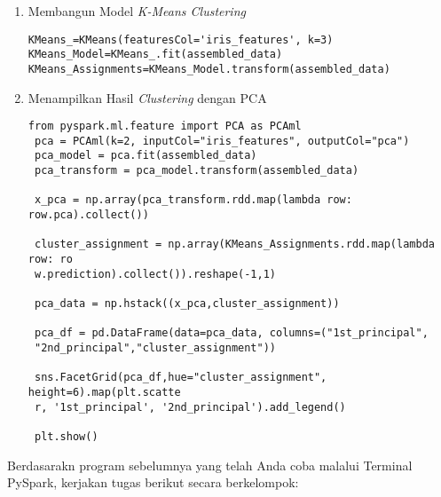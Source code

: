 \documentclass[a4paper]{tufte-handout}
\begin{document}
\begin{enumerate}
\begin{lstlisting}[language=Terminal]
for K in range(|\color{white}2|,11):
	KMeans_=KMeans(featuresCol='iris_features', k=K)
	KMeans_fit=KMeans_.fit(assembled_data)
	KMeans_transform=KMeans_fit.transform(assembled_data)
	evaluation_score=evaluator.evaluate(KMeans_transform)
	silhouette_scores.append(evaluation_score)

fig, ax = plt.subplots(1,1, figsize=(10,8))
ax.plot(range(2,11), silhouette_scores)
ax.set_xlabel('Jumlah Cluster')
ax.set_ylabel('Hasil Silhouette')
plt.show()
\end{lstlisting}

\item Membangun Model \textit{K-Means Clustering}
\begin{lstlisting}[language=Terminal]
KMeans_=KMeans(featuresCol='iris_features', k=3)
KMeans_Model=KMeans_.fit(assembled_data)
KMeans_Assignments=KMeans_Model.transform(assembled_data)
\end{lstlisting}

\item Menampilkan Hasil \textit{Clustering} dengan PCA
\begin{lstlisting}[language=Terminal]
 from pyspark.ml.feature import PCA as PCAml
 pca = PCAml(k=2, inputCol="iris_features", outputCol="pca")
 pca_model = pca.fit(assembled_data)
 pca_transform = pca_model.transform(assembled_data)

 x_pca = np.array(pca_transform.rdd.map(lambda row: row.pca).collect())

 cluster_assignment = np.array(KMeans_Assignments.rdd.map(lambda row: ro
 w.prediction).collect()).reshape(-1,1)

 pca_data = np.hstack((x_pca,cluster_assignment))

 pca_df = pd.DataFrame(data=pca_data, columns=("1st_principal",
 "2nd_principal","cluster_assignment")) 

 sns.FacetGrid(pca_df,hue="cluster_assignment", height=6).map(plt.scatte
 r, '1st_principal', '2nd_principal').add_legend()

 plt.show()
\end{lstlisting}
\end{enumerate}

\hrulefill

\clearpage


Berdasarakn program sebelumnya yang telah Anda coba malalui Terminal PySpark, kerjakan tugas berikut secara berkelompok:
\end{document}
